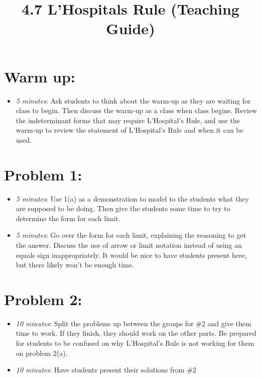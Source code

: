 \documentclass[handout,nooutcomes]{ximera}
\title{4.7 L'Hospitals Rule (Teaching Guide)}
\begin{document}
\begin{abstract}		\end{abstract}
\maketitle


\section*{Warm up:} 
	
	\begin{itemize}
	
	\item  \emph{5 minutes}:  Ask students to think about the warm-up as they are waiting for class to begin.  Then discuss the warm-up as a class when class begins.  Review the indeterminant forms that may require L'Hospital's Rule, and use the warm-up to review the statement of L'Hospital's Rule and when it can be used.
	
	
	
	\end{itemize}


\section*{Problem 1:}

	\begin{itemize}
	
	\item  \emph{5 minutes}:  Use 1(a) as a demonstration to model to the students what they are supposed to be doing.  Then give the students some time to try to determine the form for each limit.
	
	\item  \emph{5 minutes}:  Go over the form for each limit, explaining the reasoning to get the answer. Discuss the use of arrow or limit notation instead of using an equals sign inappropriately.  It would be nice to have students present here, but there likely won’t be enough time.
	
	\end{itemize}



\section*{Problem 2:}

	\begin{itemize}
	
	\item  \emph{10 minutes}:  Split the problems up between the groups for \#2 and give them time to work.  If they finish, they should work on the other parts.  Be prepared for students to be confused on why L'Hospital's Rule is not working for them on problem 2(a).
		
	\item  \emph{10 minutes}:  Have students present their solutions from \#2
			
	\end{itemize}
	
	
	

	
	
	

	
	

	
	
	

	
	
	
\end{document}
